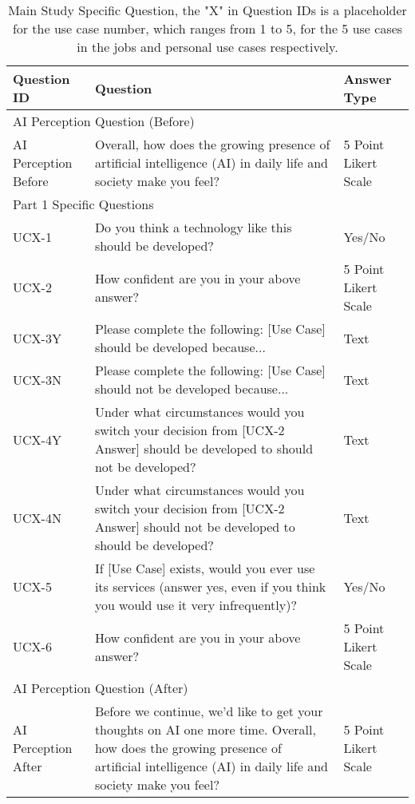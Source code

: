 \begin{table}[!hbpt]
    \footnotesize
    \centering
    \begin{tabularx}{\linewidth}{l|X|l}
    \toprule
         Question ID & Question & Answer Type \\
         \midrule
         \multicolumn{3}{l}{AI Perception Question (Before)}\\
         \midrule
         AI Perception Before & Overall, how does the growing presence of artificial intelligence (AI) in daily life and society make you feel? & 5 Point Likert Scale\\
         \midrule
         \multicolumn{3}{l}{Part 1 Specific Questions}\\
         \midrule
         UCX-1 & Do you think a technology like this should be developed? & Yes/No\\
         UCX-2 & How confident are you in your above answer? & 5 Point Likert Scale \\
         UCX-3Y & Please complete the following: [Use Case] should be developed because... & Text \\
         UCX-3N & Please complete the following: [Use Case] should not be developed because... & Text \\
         UCX-4Y & Under what circumstances would you switch your decision from [UCX-2 Answer] should be developed to should not be developed? & Text \\
         UCX-4N & Under what circumstances would you switch your decision from [UCX-2 Answer] should not be developed to should be developed? & Text \\ 
         UCX-5 & If [Use Case] exists, would you ever use its services (answer yes, even if you think you would use it very infrequently)? & Yes/No \\
         UCX-6 & How confident are you in your above answer? & 5 Point Likert Scale \\
         \midrule
         \multicolumn{3}{l}{AI Perception Question (After)}\\
         \midrule
         AI Perception After & Before we continue, we’d like to get your thoughts on AI one more time. Overall, how does the growing presence of artificial intelligence (AI) in daily life and society make you feel? & 5 Point Likert Scale \\
    \bottomrule
    \end{tabularx}
    \caption{Main Study Specific Question, the "X" in Question IDs is a placeholder for the use case number, which ranges from 1 to 5, for the 5 use cases in the jobs and personal use cases respectively.}
    \label{app:part-1-questions}
\end{table}
